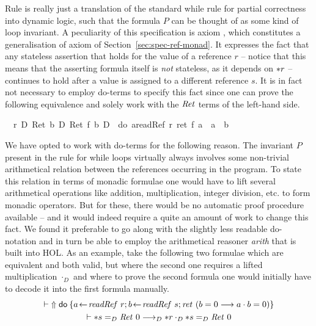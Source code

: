 Rule  is really just a translation of the standard while rule
for partial correctness into dynamic logic, such that the formula $P$ can be
thought of as some kind of loop invariant. A peculiarity of this specification
is axiom , which constitutes a generalisation of
axiom  of Section~\ref{sec:spec-ref-monad}. It expresses
the fact that any stateless assertion that holds for the value of a reference
$r$ -- notice that this means that the asserting formula itself is \emph{not}
stateless, as it depends on ${\ast r}$ -- continues to hold after a value is
assigned to a different reference $s$. It is in fact not necessary to employ
do-terms to specify this fact since one can prove the following equivalence and
solely work with the $\mathit{Ret}$ terms of the left-hand side.
\begin{isabellebody}
\isanewline
{}\ {\isachardoublequote}{\isasymturnstile}\ {\isacharasterisk}r\ {\isacharequal}\isactrlsub D\ Ret\ b\ {\isasymand}\isactrlsub D\ Ret\ {\isacharparenleft}f\ b{\isacharparenright}\ {\isasymlongleftrightarrow}\isactrlsub D\ {\isasymUp}\ {\isacharparenleft}do\ {\isacharbraceleft}a{\isasymleftarrow}readRef\ r{\isacharsemicolon}\ ret\ {\isacharparenleft}f\ a\ {\isasymand}\ a\ {\isacharequal}\ b{\isacharparenright}{\isacharbraceright}{\isacharparenright}{\isachardoublequote}\isamarkupfalse%
\isanewline
\end{isabellebody}

\begin{rem}
  We have opted to work with do-terms for the following reason. The invariant
  $P$ present in the rule for while loops virtually always involves some
  non-trivial arithmetical relation between the references occurring in the
  program. To state this relation in terms of monadic formulae one would have to
  lift several arithmetical operations like addition, multiplication, integer
  division, etc. to form monadic operators. But for these, there would be no
  automatic proof procedure available -- and it would indeed require a quite an
  amount of work to change this fact. We found it preferable to go along with
  the slightly less readable do-notation and in turn be able to employ the
  arithmetical reasoner \emph{arith} that is built into HOL. As an example, take
  the following two formulae which are equivalent and both valid, but where the
  second one requires a lifted multiplication $\cdot_D$ and where to prove the
  second formula one would initially have to decode it into the first formula
  manually.
  \begin{gather*}
    \vdash {\Uparrow\mathsf{do}\: \{a\!\gets\!\mathit{readRef}\ r; b\!\gets\!\mathit{readRef}\ s; \mathit{ret}~(b = 0 \longrightarrow
        a \cdot b = 0)\}} \\
    \vdash {\ast s} =_D \mathit{Ret}~0 \longrightarrow_D {\ast r} \cdot_D {\ast s} =_D \mathit{Ret}~0
  \end{gather*}
\end{rem}


